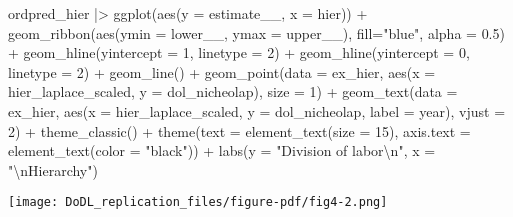 \documentclass[
  12,
  letterpaper,
  DIV=11,
  numbers=noendperiod]{scrartcl}
\newenvironment{Shaded}{\begin{snugshade}}{\end{snugshade}}
\newcommand{\AttributeTok}[1]{\textcolor[rgb]{0.40,0.45,0.13}{#1}}
\newcommand{\DecValTok}[1]{\textcolor[rgb]{0.68,0.00,0.00}{#1}}
\newcommand{\FloatTok}[1]{\textcolor[rgb]{0.68,0.00,0.00}{#1}}
\newcommand{\FunctionTok}[1]{\textcolor[rgb]{0.28,0.35,0.67}{#1}}
\newcommand{\NormalTok}[1]{\textcolor[rgb]{0.00,0.23,0.31}{#1}}
\newcommand{\SpecialCharTok}[1]{\textcolor[rgb]{0.37,0.37,0.37}{#1}}
\newcommand{\StringTok}[1]{\textcolor[rgb]{0.13,0.47,0.30}{#1}}
\begin{document}
\begin{Shaded}
\begin{Highlighting}[numbers=left,,]
\NormalTok{ordpred\_hier }\SpecialCharTok{|\textgreater{}}
  \FunctionTok{ggplot}\NormalTok{(}\FunctionTok{aes}\NormalTok{(}\AttributeTok{y =}\NormalTok{ estimate\_\_, }\AttributeTok{x =}\NormalTok{ hier)) }\SpecialCharTok{+}
  \FunctionTok{geom\_ribbon}\NormalTok{(}\FunctionTok{aes}\NormalTok{(}\AttributeTok{ymin =}\NormalTok{ lower\_\_,}
                  \AttributeTok{ymax =}\NormalTok{ upper\_\_), }\AttributeTok{fill=}\StringTok{"blue"}\NormalTok{,}
              \AttributeTok{alpha =} \FloatTok{0.5}\NormalTok{) }\SpecialCharTok{+}
  \FunctionTok{geom\_hline}\NormalTok{(}\AttributeTok{yintercept =} \DecValTok{1}\NormalTok{, }\AttributeTok{linetype =} \DecValTok{2}\NormalTok{) }\SpecialCharTok{+}
  \FunctionTok{geom\_hline}\NormalTok{(}\AttributeTok{yintercept =} \DecValTok{0}\NormalTok{, }\AttributeTok{linetype =} \DecValTok{2}\NormalTok{) }\SpecialCharTok{+}
  \FunctionTok{geom\_line}\NormalTok{() }\SpecialCharTok{+}
  \FunctionTok{geom\_point}\NormalTok{(}\AttributeTok{data =}\NormalTok{ ex\_hier, }
             \FunctionTok{aes}\NormalTok{(}\AttributeTok{x =}\NormalTok{ hier\_laplace\_scaled, }\AttributeTok{y =}\NormalTok{ dol\_nicheolap), }
             \AttributeTok{size =} \DecValTok{1}\NormalTok{) }\SpecialCharTok{+}
  \FunctionTok{geom\_text}\NormalTok{(}\AttributeTok{data =}\NormalTok{ ex\_hier, }
            \FunctionTok{aes}\NormalTok{(}\AttributeTok{x =}\NormalTok{ hier\_laplace\_scaled, }\AttributeTok{y =}\NormalTok{ dol\_nicheolap, }\AttributeTok{label =}\NormalTok{ year), }
            \AttributeTok{vjust =} \DecValTok{2}\NormalTok{) }\SpecialCharTok{+}
  \FunctionTok{theme\_classic}\NormalTok{() }\SpecialCharTok{+}
  \FunctionTok{theme}\NormalTok{(}\AttributeTok{text =} \FunctionTok{element\_text}\NormalTok{(}\AttributeTok{size =} \DecValTok{15}\NormalTok{),}
        \AttributeTok{axis.text =} \FunctionTok{element\_text}\NormalTok{(}\AttributeTok{color =} \StringTok{"black"}\NormalTok{)) }\SpecialCharTok{+}
  \FunctionTok{labs}\NormalTok{(}\AttributeTok{y =} \StringTok{"Division of labor}\SpecialCharTok{\textbackslash{}n}\StringTok{"}\NormalTok{,}
       \AttributeTok{x =} \StringTok{"}\SpecialCharTok{\textbackslash{}n}\StringTok{Hierarchy"}\NormalTok{)}
\end{Highlighting}
\end{Shaded}

\texttt{[image: DoDL\_replication\_files/figure-pdf/fig4-2.png]}
\end{document}
